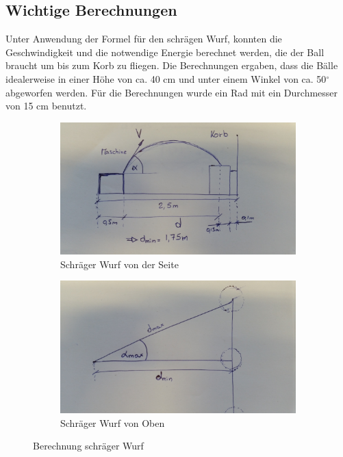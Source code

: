 \subsection{Wichtige Berechnungen}
\label{sec:berechnungen}
Unter Anwendung der Formel für den schrägen Wurf, konnten die Geschwindigkeit und die notwendige Energie berechnet werden, 
die der Ball braucht um bis zum Korb zu fliegen. Die Berechnungen ergaben, dass die Bälle idealerweise in einer Höhe von ca. 40 cm und unter einem Winkel von ca. 50$^\circ$ abgeworfen werden. Für die Berechnungen wurde ein Rad mit ein Durchmesser von 15 cm benutzt.

\begin{figure}[h!]
	\begin{subfigure}{.5\textwidth}
		\includegraphics[width=1\textwidth]{../../fig/Skizze_Berechnung_1.jpg}
		\caption{Schräger Wurf von der Seite}
	\end{subfigure}
	\begin{subfigure}{.5\textwidth}
		\includegraphics[width=1\textwidth]{../../fig/Skizze_Berechnung_2.jpg}
		\caption{Schräger Wurf von Oben}
	\end{subfigure}
	\caption{Berechnung schräger Wurf}
	\label{fig:berechnung_geschwindigkeiten}
\end{figure}

